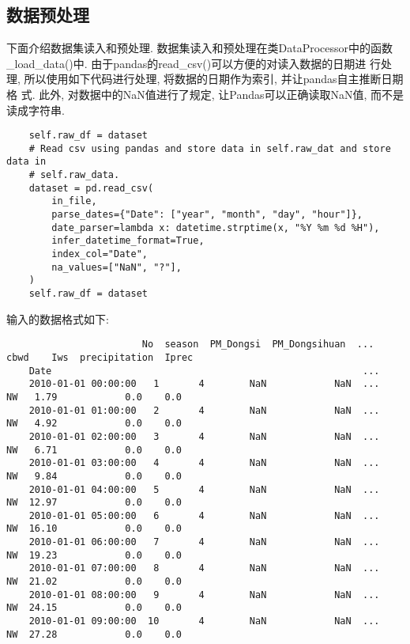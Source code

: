 \subsection{数据预处理}
下面介绍数据集读入和预处理. 数据集读入和预处理在类DataProcessor中的函数
\_load\_data()中. 由于pandas的read\_csv()可以方便的对读入数据的日期进
行处理, 所以使用如下代码进行处理, 将数据的日期作为索引, 并让pandas自主推断日期格
式. 此外, 对数据中的NaN值进行了规定, 让Pandas可以正确读取NaN值, 而不是读成字符串.
\begin{lstlisting}
    self.raw_df = dataset
    # Read csv using pandas and store data in self.raw_dat and store data in
    # self.raw_data.
    dataset = pd.read_csv(
        in_file,
        parse_dates={"Date": ["year", "month", "day", "hour"]},
        date_parser=lambda x: datetime.strptime(x, "%Y %m %d %H"),
        infer_datetime_format=True,
        index_col="Date",
        na_values=["NaN", "?"],
    )
    self.raw_df = dataset
\end{lstlisting}

输入的数据格式如下:
\begin{lstlisting}
                        No  season  PM_Dongsi  PM_Dongsihuan  ...  cbwd    Iws  precipitation  Iprec
    Date                                                       ...                               
    2010-01-01 00:00:00   1       4        NaN            NaN  ...    NW   1.79            0.0    0.0
    2010-01-01 01:00:00   2       4        NaN            NaN  ...    NW   4.92            0.0    0.0
    2010-01-01 02:00:00   3       4        NaN            NaN  ...    NW   6.71            0.0    0.0
    2010-01-01 03:00:00   4       4        NaN            NaN  ...    NW   9.84            0.0    0.0
    2010-01-01 04:00:00   5       4        NaN            NaN  ...    NW  12.97            0.0    0.0
    2010-01-01 05:00:00   6       4        NaN            NaN  ...    NW  16.10            0.0    0.0
    2010-01-01 06:00:00   7       4        NaN            NaN  ...    NW  19.23            0.0    0.0
    2010-01-01 07:00:00   8       4        NaN            NaN  ...    NW  21.02            0.0    0.0
    2010-01-01 08:00:00   9       4        NaN            NaN  ...    NW  24.15            0.0    0.0
    2010-01-01 09:00:00  10       4        NaN            NaN  ...    NW  27.28            0.0    0.0
\end{lstlisting}

